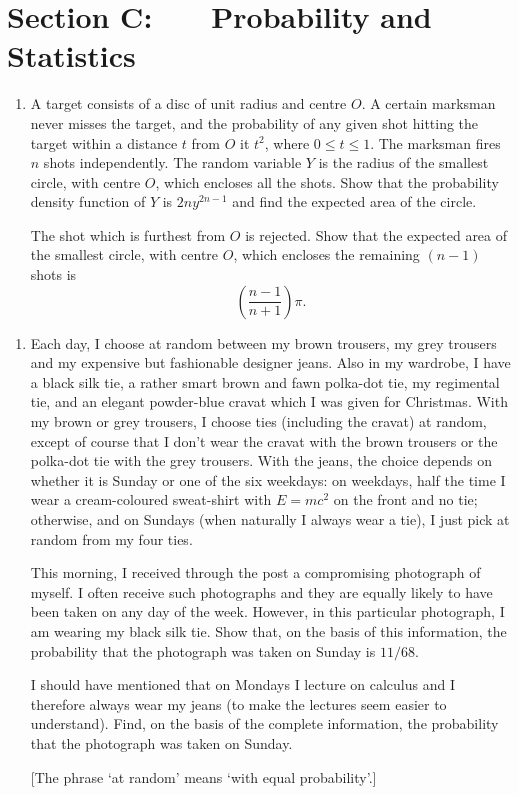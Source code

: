 \documentclass[a4, 11pt]{report}
\newlength{\qspace}
\newcounter{qnumber}
\newenvironment{question}%
 {\vspace{\qspace}
  \begin{enumerate}[\bfseries 1\quad][10]%
    \setcounter{enumi}{\value{qnumber}}%
    \item%
 }
{
  \end{enumerate}
  \filbreak
  \stepcounter{qnumber}
 }
\begin{document}
	\newpage
\section*{Section C: \ \ \ Probability and Statistics}


\begin{question}
A target consists of a disc of unit radius and centre $O$. A certain
marksman never misses the target, and the probability of any given
shot hitting the target within a distance $t$ from $O$ it $t^{2}$,
where $0\leqslant t\leqslant1$. The marksman fires $n$ shots independently.
The random variable $Y$ is the radius of the smallest circle, with
centre $O$, which encloses all the shots. Show that the probability
density function of $Y$ is $2ny^{2n-1}$ and find the expected area
of the circle. 


The shot which is furthest from $O$ is rejected. Show that the expected
area of the smallest circle, with centre $O$, which encloses the
remaining $(n-1)$ shots is 
\[
\left(\frac{n-1}{n+1}\right)\pi.
\]
\end{question}

\begin{question}
Each day, I choose at random between my brown trousers, my grey trousers
and my expensive but fashionable designer jeans. Also in my wardrobe,
I have a black silk tie, a rather smart brown and fawn polka-dot tie,
my regimental tie, and an elegant powder-blue cravat which I was given
for Christmas. With my brown or grey trousers, I choose ties (including
the cravat) at random, except of course that I don\textquoteright t
wear the cravat with the brown trousers or the polka-dot tie with
the grey trousers. With the jeans, the choice depends on whether it
is Sunday or one of the six weekdays: on weekdays, half the time I
wear a cream-coloured sweat-shirt with $E=mc{}^{2}$ on the front
and no tie; otherwise, and on Sundays (when naturally I always wear
a tie), I just pick at random from my four ties.


This morning, I received through the post a compromising photograph
of myself. I often receive such photographs and they are equally likely
to have been taken on any day of the week. However, in this particular
photograph, I am wearing my black silk tie. Show that, on the basis
of this information, the probability that the photograph was taken
on Sunday is $11/68$. 


I should have mentioned that on Mondays I lecture on calculus and
I therefore always wear my jeans (to make the lectures seem easier
to understand). Find, on the basis of the complete information, the
probability that the photograph was taken on Sunday.

[The phrase `at random' means `with equal probability'.]
\end{question}
\end{document}
